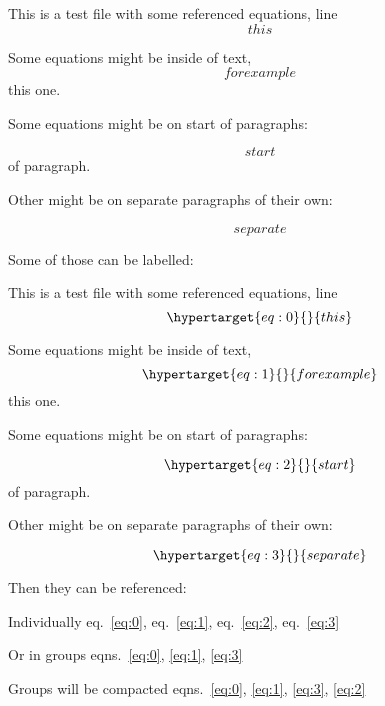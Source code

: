 This is a test file with some referenced equations, line \[ this \]

Some equations might be inside of text, \[ for example \] this one.

Some equations might be on start of paragraphs:

\[ start \] of paragraph.

Other might be on separate paragraphs of their own:

\[ separate \]

Some of those can be labelled:

This is a test file with some referenced equations, line
\begin{equation}\protect\hypertarget{eq:0}{}{ this }\label{eq:0}\end{equation}

Some equations might be inside of text,
\begin{equation}\protect\hypertarget{eq:1}{}{ for example }\label{eq:1}\end{equation}
this one.

Some equations might be on start of paragraphs:

\begin{equation}\protect\hypertarget{eq:2}{}{ start }\label{eq:2}\end{equation}
of paragraph.

Other might be on separate paragraphs of their own:

\begin{equation}\protect\hypertarget{eq:3}{}{ separate }\label{eq:3}\end{equation}

Then they can be referenced:

Individually eq.~\ref{eq:0}, eq.~\ref{eq:1}, eq.~\ref{eq:2},
eq.~\ref{eq:3}

Or in groups eqns.~\ref{eq:0}, \ref{eq:1}, \ref{eq:3}

Groups will be compacted
eqns.~\ref{eq:0}, \ref{eq:1}, \ref{eq:3}, \ref{eq:2}

